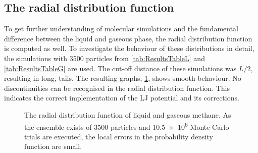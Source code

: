 \subsection{The radial distribution function}
To get further understanding of molecular simulations and the fundamental difference between the liquid and gaseous phase, the radial distribution function is computed as well. To investigate the behaviour of these distributions in detail, the simulations with \num{3500} particles from \cref{tab:ResultsTableL} and \cref{tab:ResultsTableG} are used. The cut-off distance of these simulations was $L/2$, resulting in long, tails. The resulting graphs, \cref{fig:Rad_dist}, shows smooth behaviour. No discontinuities can be recognised in the radial distribution function. This indicates the correct implementation of the LJ potential and its corrections.

\begin{figure}[th!]
	\centering
	\small
	\def\svgwidth{0.95\columnwidth}
	
	\caption{The radial distribution function of liquid and gaseous methane. As the ensemble exists of \num{3500} particles and \num{10.5e6} Monte Carlo trials are executed, the local errors in the probability density function are small.} 
	\label{fig:Rad_dist}
\end{figure}
